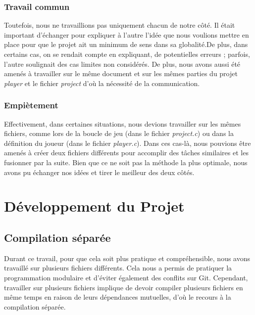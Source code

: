 \documentclass{article}
\begin{document}
\subsubsection{Travail commun}

\hspace{1em} Toutefois, nous ne travaillions pas uniquement chacun de notre côté. Il était important d'échanger pour expliquer à l'autre l'idée que nous voulions mettre en place pour que le projet ait un minimum de sens dans sa globalité.De plus, dans certains cas, on se rendait compte en expliquant, de potentielles erreurs ; parfois, l'autre soulignait des cas limites non considérés. De plus, nous avons aussi été amenés à travailler sur le même document et sur les mêmes parties du projet \emph{player} et le fichier \emph{project} d'où la nécessité de la communication. 


\subsubsection{Empiètement}

\hspace{1em} Effectivement, dans certaines situations, nous devions travailler sur les mêmes fichiers, comme lors de la boucle de jeu (dans le fichier \emph{project.c}) ou dans la définition du joueur (dans le fichier \emph{player.c}). Dans ces cas-là, nous pouvions être amenés à créer deux fichiers différents pour accomplir des tâches similaires et les fusionner par la suite. Bien que ce ne soit pas la méthode la plus optimale, nous avons pu échanger nos idées et tirer le meilleur des deux côtés. 

\section{Développement du Projet}
\vspace{1em}
\subsection{Compilation séparée}

\hspace{1em}Durant ce travail, pour que cela soit plus pratique et compréhensible, nous avons travaillé sur plusieurs fichiers différents. Cela nous a permis de pratiquer la programmation modulaire et d'éviter également des conflits sur Git. Cependant, travailler sur plusieurs fichiers implique de devoir compiler plusieurs fichiers en même temps en raison de leurs dépendances mutuelles, d'où le recours à la compilation séparée. 
\end{document}
